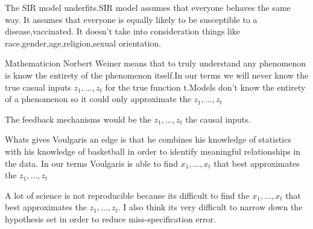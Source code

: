 \documentclass[12pt]{article}
\begin{document}
\begin{enumerate}
The SIR model underfits.SIR model assumes that everyone behaves the same way. It assumes that everyone is equally likely to be susceptible to a disease,vaccinated. It doesn't take into consideration things like race,gender,age,religion,sexual orientation. 


Mathematicion Norbert Weiner means that to truly understand any phenomenon is know the entirety of the phenomenon itself.In our terms we will never know the true casual inputs $z_1, \ldots, z_t$ for the true function t.Models don't know the entirety of a phenomenon so it could only approximate the $z_1, \ldots, z_t$


The feedback mechanisms would be the $z_1, \ldots, z_t$  the causal inputs. 



Whats gives Voulgaris an edge is that he combines his knowledge of statistics with his knowledge of basketball in order to identify meaningful relationships in the data. In our terms Voulgaris is able to find $x_1, \ldots, x_t$ that best approximates the $z_1, \ldots, z_t$


A lot of science is not reproducible because its difficult to find the $x_1, \ldots, x_t$ that best approximates the $z_1, \ldots, z_t$. I also think its very difficult to narrow down the hypothesis set in order to reduce miss-specification error. 
 



\end{enumerate}
\end{document}
